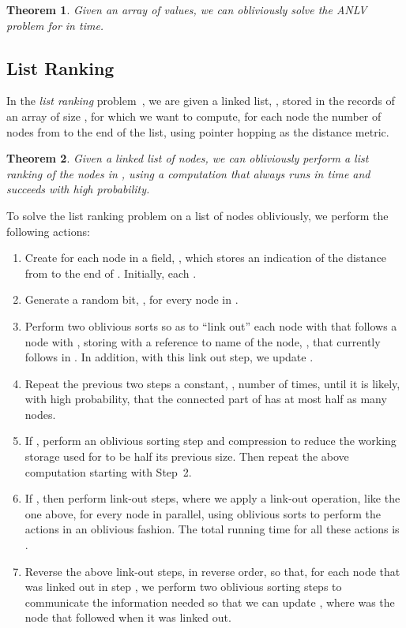\documentclass[11pt]{article}
\newenvironment{proof}{\begin{normalsize}\noindent{\bf Proof:}}{  \end{normalsize} \\}
\newtheorem{theorem}{Theorem}
\begin{document}
{\begin{theorem}
Given an array  of  values, we can obliviously 
solve the ANLV problem for  in  time.
\end{theorem}

\subsection{List Ranking}
In the \emph{list ranking}
problem~\cite{am-dplr-88,cv-dctao-86},
we are given a linked list, , stored in the
records of an array of size , for which we want to compute, for each node
 the number of nodes from  to the end of the list, using pointer
hopping as the distance metric.


\begin{theorem}
\label{thm:list-rank}
Given a linked list  of  nodes, we can obliviously perform a list
ranking of the nodes in , using a computation that always runs in 
 time and succeeds with high probability.
\end{theorem}

\begin{proof}
To solve the list ranking problem on a list  of  nodes
obliviously, we perform the following actions:
\begin{enumerate}
\item
Create for each node  in  a field, , which stores an indication
of the distance from  to the end of .
Initially, each .
\item
Generate a random bit, , for every node  in .
\item
Perform two oblivious sorts so as to ``link out'' each node  
with  that follows a node  with , storing with  a
reference to name of the node, , that currently follows  in .
In addition, with this link out step, we update .
\item
Repeat the previous two steps a constant, , number of times, until it is
likely, with high probability, that the connected part of 
has at most half as many nodes.
\item
If ,
perform an oblivious sorting
step and compression to reduce the working storage used for  to be half
its previous size.  Then repeat the above computation starting with Step~2.
\item
If , then perform  link-out steps, where we apply
a link-out operation, like the one above, for every node in parallel, using
oblivious sorts to perform the actions in an oblivious fashion.
The total running time for all these 
actions is .
\item
Reverse the above link-out steps, in reverse order, so that,
for each node  that was linked out in step , 
we perform two oblivious sorting steps
to communicate the information needed so that we can update ,
where  was the node that followed  when it was linked out.
\end{enumerate}


\end{proof}}
\end{document}
